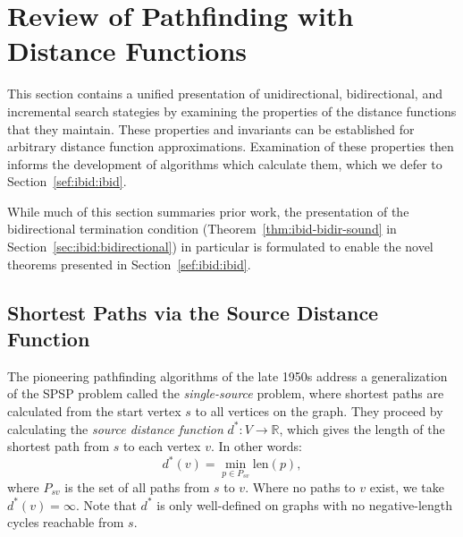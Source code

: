 \section{Review of Pathfinding with Distance Functions}
\label{sec:ibid:distance-functions}

This section contains a unified presentation of unidirectional,
bidirectional, and incremental search stategies
by examining the properties of the distance functions that they
maintain.
These properties and invariants can be established for arbitrary
distance function approximations.
Examination of these properties then informs the development of
algorithms which calculate them,
which we defer to Section~\ref{sef:ibid:ibid}.

While much of this section summaries prior work,
the presentation of the bidirectional termination condition
(Theorem~\ref{thm:ibid-bidir-sound}
in Section~\ref{sec:ibid:bidirectional})
in particular
is formulated to enable the novel theorems
presented in Section~\ref{sef:ibid:ibid}.

\subsection{Shortest Paths via the Source Distance Function}

The pioneering pathfinding algorithms of the late 1950s address
a generalization of the SPSP problem called
the \emph{single-source} problem,
where shortest paths are calculated from the start vertex $s$
to all vertices on the graph.
They proceed by calculating the \emph{source distance function}
$d^* : V \rightarrow \mathbb{R}$,
which gives the length of the shortest path from $s$
to each vertex $v$.
In other words:
\begin{equation}
   d^*(v) = \min_{p \in P_{sv}} \mbox{len}(p),
   \label{eqn:ibid-distance-function-global}
\end{equation}
where $P_{sv}$ is the set of all paths from $s$ to $v$.
Where no paths to $v$ exist,
we take $d^*(v) = \infty$.
Note that $d^*$ is only well-defined on graphs with no negative-length
cycles reachable from $s$.

